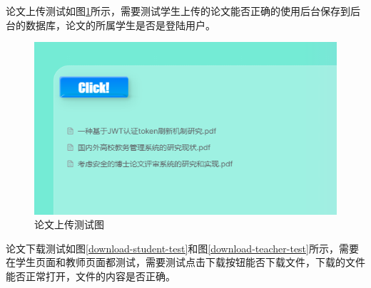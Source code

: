 论文上传测试如图\ref{upload-test}所示，需要测试学生上传的论文能否正确的使用后台保存到后台的数据库，论文的所属学生是否是登陆用户。

\begin{figure}[H]
  \centering
  \includegraphics[scale = 0.8]{out/figure/测试/upload-test.png}
  \caption{\song\wuhao 论文上传测试图}
  \label{upload-test}
\end{figure}

论文下载测试如图\ref{download-student-test}和图\ref{download-teacher-test}所示，需要在学生页面和教师页面都测试，需要测试点击下载按钮能否下载文件，下载的文件能否正常打开，文件的内容是否正确。

